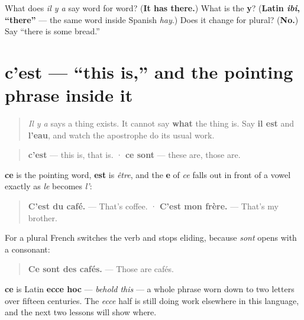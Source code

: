 \begin{tcolorbox}[breakable,colback=teal!4,colframe=teal!35!black,title={Before you move on}]
What does \emph{il y a} say word for word? (\textbf{It has there.}) What is the \textbf{y}? (\textbf{Latin \emph{ibi}, \textquotedblleft{}there\textquotedblright{}} — the same word inside Spanish \emph{hay}.) Does it change for plural? (\textbf{No.}) Say \textquotedblleft{}there is some bread.\textquotedblright{}
\end{tcolorbox}
\section[c'est]{c'est — \textquotedblleft{}this is,\textquotedblright{} and the pointing phrase inside it}

\label{lesson:FR-C34-cest}



\begin{quote}
\emph{Il y a} says a thing exists. It cannot say \textbf{what} the thing is. Say \textbf{il est} and \textbf{l'eau}, and watch the apostrophe do its usual work.
\end{quote}

\begin{cousinweb}
\begin{quote}
\textbf{c'est} — this is, that is. · \textbf{ce sont} — these are, those are.
\end{quote}

\textbf{ce} is the pointing word, \textbf{est} is \emph{être}, and the \textbf{e} of \emph{ce} falls out in front of a vowel exactly as \emph{le} becomes \emph{l'}:

\begin{quote}
\textbf{C'est du café.} — That's coffee. · \textbf{C'est mon frère.} — That's my brother.
\end{quote}

For a plural French switches the verb and stops eliding, because \emph{sont} opens with a consonant:

\begin{quote}
\textbf{Ce sont des cafés.} — Those are cafés.
\end{quote}

\textbf{ce} is Latin \textbf{ecce hoc} — \emph{behold this} — a whole phrase worn down to two letters over fifteen centuries. The \emph{ecce} half is still doing work elsewhere in this language, and the next two lessons will show where.
\end{cousinweb}

